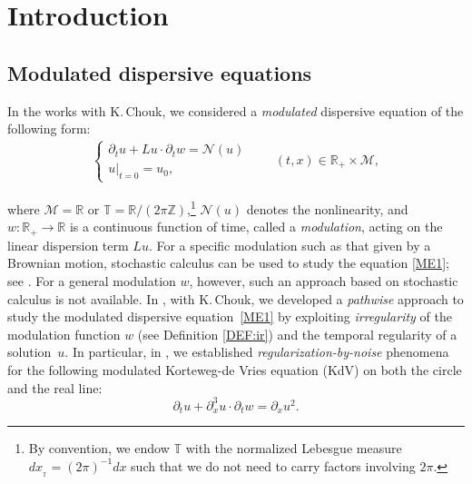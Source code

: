 \documentclass[letterpaper, 11pt,  reqno]{amsart}
\newcommand{\1}{\hspace{0.5mm}\text{I}\hspace{0.5mm}}
\newcommand{\noi}{\noindent}
\newcommand{\Z}{\mathbb{Z}}
\newcommand{\R}{\mathbb{R}}
\newcommand{\T}{\mathbb{T}}
\newcommand{\dx}{\partial_x}
\newcommand{\dt}{\partial_t}
\newcommand{\M}{\mathcal{M}}
\newcommand{\NN}{\mathcal{N}}
\numberwithin{equation}{section}
\numberwithin{theorem}{section}
\begin{document}
%
\maketitle
%


\tableofcontents














\newpage

\section{Introduction}\label{SEC:1}

\subsection{Modulated dispersive equations}
\label{SUBSEC:1.1}


In the works \cite{CG1, CGLLO1}
 with K.\,Chouk, we  
 considered a {\it modulated} dispersive equation of the following form:
 \begin{align}
\begin{cases}
\dt u +  L u \cdot \dt w=  \NN(u)  \\ 
u|_{t = 0} = u_0,
\end{cases}
\qquad ( t, x) \in \R_+ \times \M,
\label{ME1}
\end{align}


\noi
where $\M  = \R$ or $\T = \R/ (2\pi \Z)$,\footnote{By convention, we endow
$\T$ with the normalized Lebesgue measure $ dx_{_\T} =  (2\pi)^{-1}dx$
such that we do not need to carry factors involving $2\pi$.}
$\NN(u)$ denotes the nonlinearity, 
and 
 $w:\R_+\to\R$ is a continuous function of time, 
called a {\it modulation}, 
 acting on the linear dispersion term $Lu$.
For a specific modulation such as that given by a Brownian motion, 
stochastic calculus can be used to study 
the equation \eqref{ME1};  see \cite{DD, DT, DR2, Ste}.
For a general modulation $w$, however, 
such an approach based on stochastic calculus
is not available.
In \cite{CG1, CGLLO1},  
 with K.\,Chouk, we  
 developed 
  a {\it pathwise} approach 
to study the modulated dispersive equation~\eqref{ME1}
by exploiting {\it irregularity} of the modulation function $w$
(see Definition \ref{DEF:ir})
and  the temporal regularity of a solution~$u$.
In particular, 
in \cite{CGLLO1}, 
we established 
{\it regularization-by-noise}
phenomena for the following  modulated 
 Korteweg-de Vries equation (KdV)
 on both the circle and the real line:
\begin{equation}
\label{kdv1}
\dt u+  \dx^3 u \cdot \dt w =\dx u^2.
\end{equation}
\end{document}
